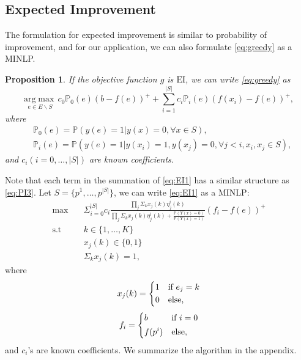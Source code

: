 \documentclass[12pt]{article}
\newcommand{\Prob}{\mathbb{P}}
\newcommand{\EI}{\mathrm{EI}}
\newtheorem{proposition}{Proposition}
\begin{document}
\subsection{Expected Improvement}
The formulation for expected improvement is similar to probability of improvement, and for our application, we can also formulate \eqref{eq:greedy} as a MINLP.
\begin{proposition}
  If the objective function $g$ is $\EI$, we can write \eqref{eq:greedy} as 
  \begin{equation} \label{eq:EI1}
    \underset{e \in E \backslash S}{\mathrm{arg}\max} \, c_0 \mathbb{P}_0(e)(b-f(e))^+ + \sum_{i=1}^{|S|} c_i \mathbb{P}_i(e)(f(x_i)-f(e))^+,
  \end{equation}
  where
  \begin{equation*}
    \begin{split}
      &\mathbb{P}_0(e)=\mathbb{P}(y(e)=1|y(x)=0, \forall x \in S), \\
      &\mathbb{P}_i(e)=\mathbb{P}(y(e)=1|y(x_i)=1, y(x_j)=0, \forall j<i, x_i,x_j \in S),
    \end{split}
  \end{equation*}
  and $c_i (i=0,\ldots,|S|)$ are known coefficients.
\end{proposition}

Note that each term in the summation of \eqref{eq:EI1} has a similar structure as \eqref{eq:PI3}. Let $S=\{p^1,\ldots,p^{|S|}\}$, we can write \eqref{eq:EI1} as a MINLP:
\begin{equation} \label{eq:EI5}
\begin{split}
\max \quad &\Sigma_{i=0}^{|S|} c_i \frac{\prod_j \Sigma_k x_j(k) \eta_j^i(k)}{\prod_j \Sigma_k x_j(k) \eta_j^i(k) + \frac{\Prob(Y(x)=0)}{\Prob(Y(x)=1)}} (f_i-f(e))^+ \\
\text{s.t} \quad &k \in \{1,\ldots,K\} \\
&x_j(k) \in \{0,1\}\\
&\Sigma_k x_j(k)=1,
\end{split}
\end{equation}
where
\begin{equation*}
x_j(k)=\begin{dcases}
        1 & \text{if $e_j=k$}\\
        0 & \text{else},
\end{dcases}
\end{equation*}
\begin{equation*}
f_i=\begin{dcases}
        b & \text{if $i=0$}\\
        f(p^i)  & \text{else},
\end{dcases}
\end{equation*}
and $c_i$'s are known coefficients. We summarize the algorithm in the appendix.
\end{document}
